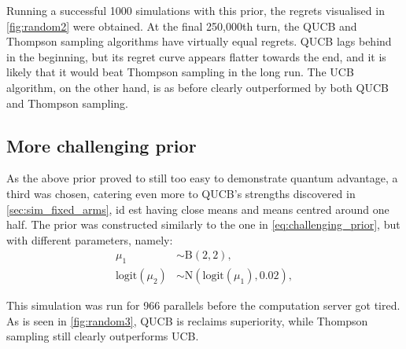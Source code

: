 Running a successful 1000 simulations with this prior, the regrets visualised in \cref{fig:random2} were obtained.
At the final 250,000th turn, the QUCB and Thompson sampling algorithms have virtually equal regrets.
QUCB lags behind in the beginning, but its regret curve appears flatter towards the end, and it is likely that it would beat Thompson sampling in the long run.
The UCB algorithm, on the other hand, is as before clearly outperformed by both QUCB and Thompson sampling.

\subsection{More challenging prior}
As the above prior proved to still too easy to demonstrate quantum advantage, a third was chosen, catering even more to QUCB's strengths discovered in \cref{sec:sim_fixed_arms}, id est having close means and means centred around one half.
The prior was constructed similarly to the one in \cref{eq:challenging_prior}, but with different parameters, namely:
\begin{equation}
    \label{eq:more_challenging_prior}
    \begin{aligned}
        \mu_1               & \sim \text{B}(2, 2),                      \\
        \text{logit}(\mu_2) & \sim \text{N}(\text{logit}(\mu_1), 0.02),
    \end{aligned}
\end{equation}

This simulation was run for 966 parallels before the computation server got tired.
As is seen in \cref{fig:random3}, QUCB is reclaims superiority, while Thompson sampling still clearly outperforms UCB.


